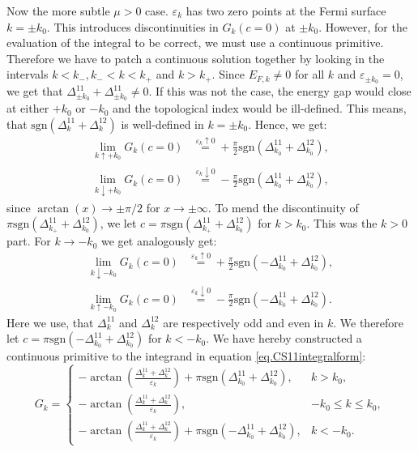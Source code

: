 Now the more subtle $\mu > 0$ case. $\varepsilon_k$ has two zero points at the Fermi surface $k = \pm k_0$. This introduces discontinuities in $G_k(c=0)$ at $\pm k_0$. However, for the evaluation of the integral to be correct, we must use a continuous primitive. Therefore we have to patch a continuous solution together by looking in the intervals $k < k_-, k_- < k < k_+$ and $k>k_+$. Since $E_{F,k} \neq 0$ for all $k$ and $\varepsilon_{\pm k_0} = 0$, we get that $\Delta^{11}_{\pm k_0} + \Delta^{11}_{\pm k_0} \neq 0$. If this was not the case, the energy gap would close at either $+k_0$ or $-k_0$ and the topological index would be ill-defined. This means, that $\text{sgn}(\Delta^{11}_k + \Delta^{12}_k)$ is well-defined in $k = \pm k_0$. Hence, we get:
\begin{align}
\lim_{k \uparrow +k_0} G_k(c = 0)   &\overset{\varepsilon_k \uparrow 0}{=}   +\frac{\pi}{2}\text{sgn}(\Delta^{11}_{k_0} + \Delta^{12}_{k_0}), \nonumber \\
\lim_{k \downarrow +k_0} G_k(c = 0) &\overset{\varepsilon_k \downarrow 0}{=} -\frac{\pi}{2}\text{sgn}(\Delta^{11}_{k_0} + \Delta^{12}_{k_0}), \nonumber
\end{align}
since $\arctan(x) \to \pm \pi/2$ for $x \to \pm \infty$. To mend the discontinuity of $\pi\text{sgn}(\Delta^{11}_{k_+} + \Delta^{12}_{k_0})$, we let $c = \pi\text{sgn}(\Delta^{11}_{k_+} + \Delta^{12}_{k_0})$ for $k > k_0$. This was the $k > 0$ part. For $k \to -k_0$ we get analogously get:
\begin{align}
\lim_{k \downarrow -k_0} G_k(c = 0) &\overset{\varepsilon_k \uparrow 0}{=} +\frac{\pi}{2}\text{sgn}(-\Delta^{11}_{k_0} + \Delta^{12}_{k_0}), \nonumber \\
\lim_{k \uparrow -k_0} G_k(c = 0)   &\overset{\varepsilon_k \downarrow 0}{=} -\frac{\pi}{2}\text{sgn}(-\Delta^{11}_{k_0} + \Delta^{12}_{k_0}). \nonumber
\end{align}
Here we use, that $\Delta^{11}_k$ and $\Delta^{12}_k$ are respectively odd and even in $k$. We therefore let $c = \pi \text{sgn}(-\Delta^{11}_{k_0} + \Delta^{12}_{k_0})$ for $k < - k_0$. We have hereby constructed a continuous primitive to the integrand in equation \eqref{eq.CS11integralform}:
\begin{equation}
G_k = \left\{ \begin{matrix} 
-\arctan\left(\frac{\Delta^{11}_k + \Delta^{12}_k }{\varepsilon_k}\right) + \pi\text{sgn}(\Delta^{11}_{k_0} + \Delta^{12}_{k_0}), & k > k_0, \\
-\arctan\left(\frac{\Delta^{11}_k + \Delta^{12}_k }{\varepsilon_k}\right), & -k_0 \leq k \leq k_0, \\
-\arctan\left(\frac{\Delta^{11}_k + \Delta^{12}_k }{\varepsilon_k}\right) + \pi \text{sgn}(-\Delta^{11}_{k_0} + \Delta^{12}_{k_0}), & k < -k_0.
  \end{matrix} \right.
\label{eq.Gkmugreater0}
\end{equation}

